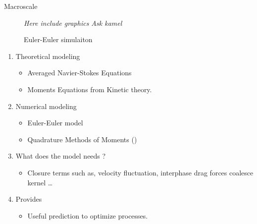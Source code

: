 \documentclass{sintefbeamer}
\begin{document}
\begin{frame}{Macroscale}
  \begin{figure}
    \textit{Here include graphics Ask kamel}
    \caption{Euler-Euler simulaiton}
  \end{figure}
  \begin{enumerate}
    \item Theoretical modeling 
    \begin{itemize}
      \item Averaged Navier-Stokes Equations 
      \item Moments Equations from Kinetic theory. 
    \end{itemize}
    \item Numerical modeling 
    \begin{itemize}
      \item Euler-Euler model
      \item Quadrature Methods of Moments (\citet{fox2023generalized})
    \end{itemize}
    \item What does the model needs ? 
    \begin{itemize}
      \item Closure terms such as, velocity fluctuation, interphase drag forces coalesce kernel \ldots
    \end{itemize}
    \item Provides 
    \begin{itemize}
      \item Useful prediction to optimize processes. 
    \end{itemize}
  \end{enumerate}
\end{frame}
\end{document}

